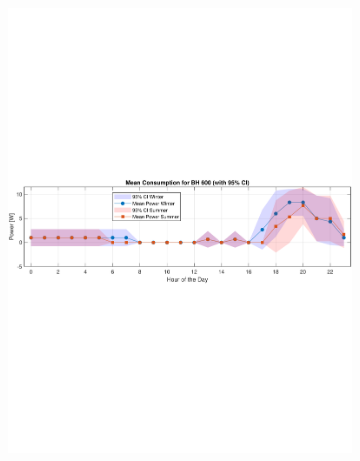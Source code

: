 \begin{figure}[H]
\begin{minipage}[t]{0.45\linewidth}
\begin{subfigure}{\linewidth}
            \includegraphics[width=\linewidth, height=\RightImageEachHeight, keepaspectratio]{photos/Mean_consumption_winter&summer_system2_with_95CI.pdf}%
        \end{subfigure}
        \par\vspace{\RightImageVSpace}
        \begin{subfigure}{\linewidth}

\end{subfigure}
\end{minipage}
\end{figure}
